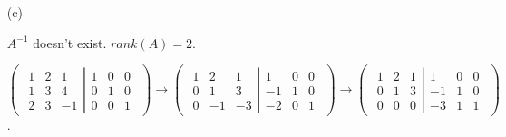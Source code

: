 \begin{Exercise}
\begin{enumerate}[(a)]
\item[(c)]
\begin{answer}
$A^{-1}$ doesn't exist. $rank(A) = 2$.
\end{answer}
\begin{solution}
$\begin{pmatrix} \left.\begin{matrix}
1 & 2 & 1 \\
1 & 3 & 4 \\
2 & 3 & -1
\end{matrix} \right| \begin{matrix}
1 & 0 & 0 \\
0 & 1 & 0 \\
0 & 0 & 1
\end{matrix} \end{pmatrix} \longrightarrow \begin{pmatrix} \left.\begin{matrix}
1 & 2 & 1 \\
0 & 1 & 3 \\
0 & -1 & -3
\end{matrix} \right| \begin{matrix}
1 & 0 & 0 \\
-1 & 1 & 0 \\
-2 & 0 & 1
\end{matrix} \end{pmatrix} \longrightarrow \begin{pmatrix} \left.\begin{matrix}
1 & 2 & 1 \\
0 & 1 & 3 \\
0 & 0 & 0 
\end{matrix} \right| \begin{matrix}
1 & 0 & 0 \\
-1 & 1 & 0 \\
-3 & 1 & 1
\end{matrix} \end{pmatrix}$.
\end{solution}
\end{enumerate}
\end{Exercise}